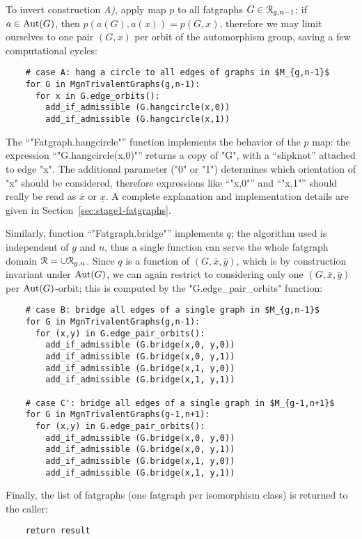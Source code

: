 To invert construction {\slshape A)}, apply map $p$ to all fatgraphs $G \in
\mathcal{R}_{g,n-1}$; if $a \in \operatorname{Aut}(G)$, then $p(a(G), a(x)) = p(G, x)$,
therefore we may limit ourselves to one pair $(G,x)$ per orbit of the
automorphism group, saving a few computational cycles:
\begin{lstlisting}
    # case A: hang a circle to all edges of graphs in $M_{g,n-1}$
    for G in MgnTrivalentGraphs(g,n-1):
      for x in G.edge_orbits():
        add_if_admissible (G.hangcircle(x,0))
        add_if_admissible (G.hangcircle(x,1))

\end{lstlisting}
The ``"Fatgraph.hangcircle"'' function implements the behavior of the
$p$ map: the expression ``"G.hangcircle(x,0)"'' returns a copy of
"G", with a ``slipknot'' attached to edge "x".  The additional
parameter ("0" or "1") determines which orientation of "x"
should be considered, therefore expressions like ``"x,0"'' and
``"x,1"'' should really be read as $\bar{x}$ or $\underline{x}$. A
complete explanation and implementation details are given in
Section~\ref{sec:stage1-fatgraphs}.

Similarly, function ``"Fatgraph.bridge"'' implements $q$;
the algorithm used is independent of $g$ and $n$, thus a single
function can serve the whole fatgraph domain $\mathcal{R} = \cup
\mathcal{R}_{g,n}$. Since $q$ is a function of $(G, \bar{x}, \bar{y})$, which
is by construction invariant under $\operatorname{Aut}(G)$, we can again restrict
to considering only one $(G, \bar{x}, \bar{y})$ per $\operatorname{Aut}(G)$-orbit;
this is computed by the "G.edge_pair_orbits" function:
\begin{lstlisting}
    # case B: bridge all edges of a single graph in $M_{g,n-1}$
    for G in MgnTrivalentGraphs(g,n-1):
      for (x,y) in G.edge_pair_orbits():
        add_if_admissible (G.bridge(x,0, y,0))
        add_if_admissible (G.bridge(x,0, y,1))
        add_if_admissible (G.bridge(x,1, y,0))
        add_if_admissible (G.bridge(x,1, y,1))

    # case C': bridge all edges of a single graph in $M_{g-1,n+1}$
    for G in MgnTrivalentGraphs(g-1,n+1):
      for (x,y) in G.edge_pair_orbits():
        add_if_admissible (G.bridge(x,0, y,0))
        add_if_admissible (G.bridge(x,0, y,1))
        add_if_admissible (G.bridge(x,1, y,0))
        add_if_admissible (G.bridge(x,1, y,1))

\end{lstlisting}

Finally, the list of fatgraphs (one fatgraph per isomorphism class) is
returned to the caller:
\begin{lstlisting}
    return result
\end{lstlisting}


